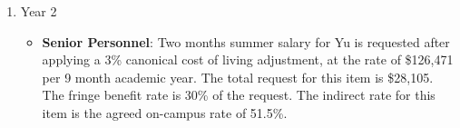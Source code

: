 \begin{enumerate}
\begin{itemize}






\end{itemize}

\item{Year 2}
\begin{itemize}
\item{{\bf Senior Personnel}: Two months summer salary for Yu is requested after applying a 3\% canonical cost of living adjustment, at the rate of \$126,471 per 9 month academic year.  The total request for this item is \$28,105.   The fringe benefit rate is 30\% of the request.  The indirect rate for this item is the agreed on-campus rate of 51.5\%.}


\end{itemize}
\end{enumerate}
